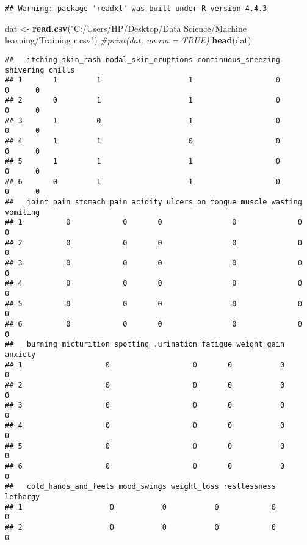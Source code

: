 \documentclass[
]{article}
\newenvironment{Shaded}{\begin{snugshade}}{\end{snugshade}}
\newcommand{\CommentTok}[1]{\textcolor[rgb]{0.56,0.35,0.01}{\textit{#1}}}
\newcommand{\FunctionTok}[1]{\textcolor[rgb]{0.13,0.29,0.53}{\textbf{#1}}}
\newcommand{\NormalTok}[1]{#1}
\newcommand{\OtherTok}[1]{\textcolor[rgb]{0.56,0.35,0.01}{#1}}
\newcommand{\StringTok}[1]{\textcolor[rgb]{0.31,0.60,0.02}{#1}}
\begin{document}
\begin{verbatim}
## Warning: package 'readxl' was built under R version 4.4.3
\end{verbatim}

\begin{Shaded}
\begin{Highlighting}[]
\NormalTok{dat }\OtherTok{\textless{}{-}} \FunctionTok{read.csv}\NormalTok{(}\StringTok{"C:/Users/HP/Desktop/Data Science/Machine learning/Training r.csv"}\NormalTok{)}
\CommentTok{\#print(dat, na.rm = TRUE)}
\FunctionTok{head}\NormalTok{(dat)}
\end{Highlighting}
\end{Shaded}

\begin{verbatim}
##   itching skin_rash nodal_skin_eruptions continuous_sneezing shivering chills
## 1       1         1                    1                   0         0      0
## 2       0         1                    1                   0         0      0
## 3       1         0                    1                   0         0      0
## 4       1         1                    0                   0         0      0
## 5       1         1                    1                   0         0      0
## 6       0         1                    1                   0         0      0
##   joint_pain stomach_pain acidity ulcers_on_tongue muscle_wasting vomiting
## 1          0            0       0                0              0        0
## 2          0            0       0                0              0        0
## 3          0            0       0                0              0        0
## 4          0            0       0                0              0        0
## 5          0            0       0                0              0        0
## 6          0            0       0                0              0        0
##   burning_micturition spotting_.urination fatigue weight_gain anxiety
## 1                   0                   0       0           0       0
## 2                   0                   0       0           0       0
## 3                   0                   0       0           0       0
## 4                   0                   0       0           0       0
## 5                   0                   0       0           0       0
## 6                   0                   0       0           0       0
##   cold_hands_and_feets mood_swings weight_loss restlessness lethargy
## 1                    0           0           0            0        0
## 2                    0           0           0            0        0

\end{verbatim}
\end{document}
